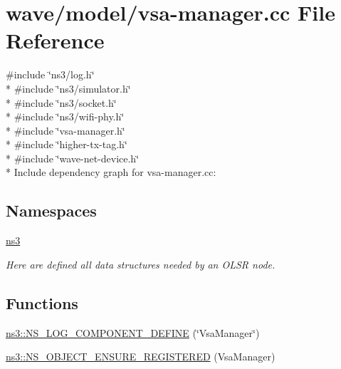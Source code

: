 \hypertarget{vsa-manager_8cc}{}\section{wave/model/vsa-\/manager.cc File Reference}
\label{vsa-manager_8cc}
{\ttfamily \#include \char`\"{}ns3/log.\+h\char`\"{}}\\*
{\ttfamily \#include \char`\"{}ns3/simulator.\+h\char`\"{}}\\*
{\ttfamily \#include \char`\"{}ns3/socket.\+h\char`\"{}}\\*
{\ttfamily \#include \char`\"{}ns3/wifi-\/phy.\+h\char`\"{}}\\*
{\ttfamily \#include \char`\"{}vsa-\/manager.\+h\char`\"{}}\\*
{\ttfamily \#include \char`\"{}higher-\/tx-\/tag.\+h\char`\"{}}\\*
{\ttfamily \#include \char`\"{}wave-\/net-\/device.\+h\char`\"{}}\\*
Include dependency graph for vsa-\/manager.cc\+:
\subsection*{Namespaces}
\begin{DoxyCompactItemize}
\item 
 \hyperlink{namespacens3}{ns3}
\begin{DoxyCompactList}\small\item\em Here are defined all data structures needed by an O\+L\+SR node. \end{DoxyCompactList}\end{DoxyCompactItemize}
\subsection*{Functions}
\begin{DoxyCompactItemize}
\item 
\hyperlink{namespacens3_a3aef60e915d4d9bd7b238d4e6406bfc2}{ns3\+::\+N\+S\+\_\+\+L\+O\+G\+\_\+\+C\+O\+M\+P\+O\+N\+E\+N\+T\+\_\+\+D\+E\+F\+I\+NE} (\char`\"{}Vsa\+Manager\char`\"{})
\item 
\hyperlink{namespacens3_ab622496fd2894f670c84c3cca98c59da}{ns3\+::\+N\+S\+\_\+\+O\+B\+J\+E\+C\+T\+\_\+\+E\+N\+S\+U\+R\+E\+\_\+\+R\+E\+G\+I\+S\+T\+E\+R\+ED} (Vsa\+Manager)
\end{DoxyCompactItemize}
